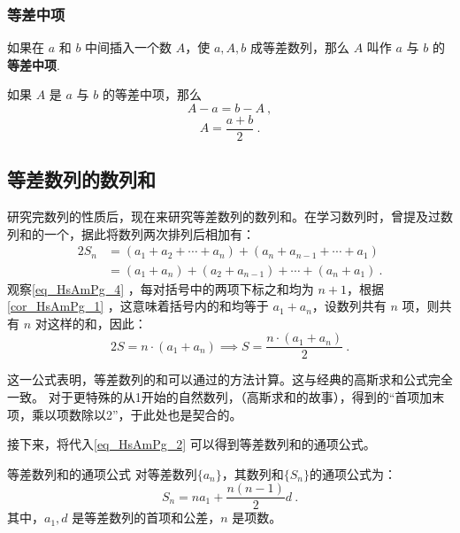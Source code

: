 \subsubsection{等差中项}

如果在 $a$ 和 $b$ 中间插入一个数 $A$，使 $a,A,b$ 成等差数列，那么 $A$ 叫作 $a$ 与 $b$ 的\textbf{等差中项}.

如果 $A$ 是 $a$ 与 $b$ 的等差中项，那么
\begin{equation}
A - a = b - A~,
\end{equation}
\begin{equation}
A = \frac{a+b}{2}~.
\end{equation}


\subsection{等差数列的数列和}

研究完数列的性质后，现在来研究等差数列的数列和。在学习数列时，曾提及过数列和的一个，据此将数列两次排列后相加有：
\begin{equation}\label{eq_HsAmPg_4}
\begin{split}
2S_n &= (a_1 + a_2 + \cdots + a_n)+(a_n + a_{n-1} + \cdots + a_1)\\
&=(a_1+a_{n})+(a_2+a_{n-1}) +\cdots +(a_n+a_1)~.
\end{split}
\end{equation}
观察\autoref{eq_HsAmPg_4} ，每对括号中的两项下标之和均为 $n+1$，根据\autoref{cor_HsAmPg_1} ，这意味着括号内的和均等于 $a_1 + a_n$，设数列共有 $n$ 项，则共有 $n$ 对这样的和，因此：
\begin{equation}\label{eq_HsAmPg_2}
2S = n \cdot (a_1+a_n)\implies S = \frac{n\cdot(a_1+a_n)}{2}~.
\end{equation}

这一公式表明，等差数列的和可以通过的方法计算。这与经典的高斯求和公式完全一致。
对于更特殊的从1开始的自然数列，（高斯求和的故事），得到的“首项加末项，乘以项数除以2”，于此处也是契合的。

接下来，将代入\autoref{eq_HsAmPg_2} 可以得到等差数列和的通项公式。
\begin{corollary}{等差数列和的通项公式}
对等差数列$\{a_n\}$，其数列和$\{S_n\}$的通项公式为：
\begin{equation}\label{eq_HsAmPg_3}
S_n = na_1+\frac{n(n-1)}{2}d~.
\end{equation}
其中，$a_1,d$ 是等差数列的首项和公差，$n$ 是项数。
\end{corollary}


